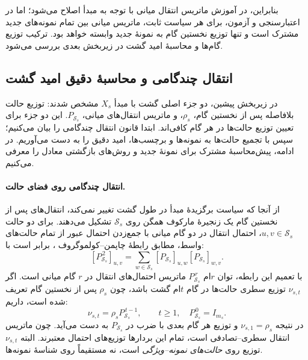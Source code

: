 بنابراین، در آموزش ماتریس انتقال میانی
با توجه به مبدأ اصلاح می‌شود؛ اما در
اعتبارسنجی و آزمون، برای هر سیاست ثابت،
ماتریس میانی بین تمام نمونه‌های جدید
مشترک است و تنها توزیع نخستین گام
به نمونهٔ جدید وابسته خواهد بود.
ترکیب توزیع گام‌ها و محاسبهٔ امید
گشت در زیربخش بعدی بررسی می‌شود.

\subsection{انتقال چندگامی و محاسبهٔ دقیق امید گشت}
\label{cmp:subsec:ch3-exact-matrix-walk}
در زیربخش پیشین، دو جزء اصلی گشت با مبدأ
$X_s$ مشخص شدند: توزیع حالت بلافاصله پس از
نخستین گام، $\rho_s$، و ماتریس انتقال‌های
میانی، $P_{\mathcal S_s}$. این دو جزء برای
تعیین توزیع حالت‌ها در هر گام کافی‌اند.
ابتدا قانون انتقال چندگامی را بیان می‌کنیم؛
سپس با تجمیع حالت‌ها به نمونه‌ها و برچسب‌ها،
امید دقیق را به دست می‌آوریم. در ادامه،
پیش‌محاسبهٔ مشترک برای نمونهٔ جدید و روش‌های
بازگشتی معادل را معرفی می‌کنیم.

\paragraph{انتقال چندگامی روی فضای حالت.}
از آنجا که سیاست برگزیدهٔ مبدأ در طول گشت
تغییر نمی‌کند، انتقال‌های پس از نخستین گام
یک زنجیرهٔ مارکوف همگن روی
$\mathcal S_s$ تشکیل می‌دهند. برای دو
حالت $u,v\in\mathcal S_s$، احتمال
انتقال در دو گام میانی با جمع‌زدن احتمال
عبور از تمام حالت‌های واسط، مطابق رابطهٔ چاپمن--کولموگروف \cite{Norris1997MarkovChains}، برابر است با:
\[
[P_{\mathcal S_s}^{\,2}]_{u,v}
=\sum_{w\in\mathcal S_s}
[P_{\mathcal S_s}]_{u,w}
[P_{\mathcal S_s}]_{w,v}.
\]
با تعمیم این رابطه، توان $r$ام
$P_{\mathcal S_s}^{\,r}$ ماتریس
احتمال‌های انتقال در $r$ گام میانی است.
اگر $\nu_{s,t}$ توزیع سطری حالت‌ها در
گام $t$ام گشت باشد، چون $\rho_s$
پس از نخستین گام تعریف شده است، داریم:
\begin{equation}\label{cmp:eq:ch3-multistep-state}
\boxed{
\nu_{s,t}=\rho_sP_{\mathcal S_s}^{\,t-1},
\qquad t\ge1,\quad P_{\mathcal S_s}^{\,0}=I_{m_s}.
}
\end{equation}
در نتیجه $\nu_{s,1}=\rho_s$ و توزیع
هر گام بعدی با ضرب در $P_{\mathcal S_s}$
به دست می‌آید. چون ماتریس انتقال
سطری--تصادفی است، تمام این بردارها
توزیع‌های احتمال معتبرند. البته
$\nu_{s,t}$ توزیع روی
\emph{حالت‌های نمونه--ویژگی} است، نه
مستقیماً روی شناسهٔ نمونه‌ها.


